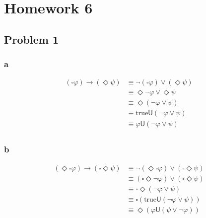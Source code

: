 \chapter{Homework 6}

\section{Problem 1}

\subsection{a}


$$
\begin{aligned}
    (\square \varphi) \rightarrow (\Diamond \psi)
    & \equiv \neg (\square \varphi) \vee (\Diamond \psi) \\
    & \equiv \Diamond \neg \varphi \vee \Diamond \psi \\
    & \equiv \Diamond (\neg \varphi \vee \psi) \\
    & \equiv \text{true} \mathsf{U} (\neg \varphi \vee \psi) \\
    & \equiv \varphi \mathsf{U} (\neg \varphi \vee \psi) \\
\end{aligned}
$$

\subsection{b}


$$
\begin{aligned}
    (\Diamond \square \varphi) \rightarrow (\square \Diamond \psi)
    & \equiv \neg (\Diamond \square \varphi) \vee (\square \Diamond \psi) \\
    & \equiv (\square \Diamond \neg \varphi) \vee (\square \Diamond \psi) \\
    & \equiv \square \Diamond (\neg \varphi \vee \psi) \\
    & \equiv \square (\text{true} \mathsf{U} (\neg \varphi \vee \psi)) \\
    & \equiv \Diamond (\varphi \mathsf{U} (\psi \vee \neg \varphi)) \\
\end{aligned}
$$

